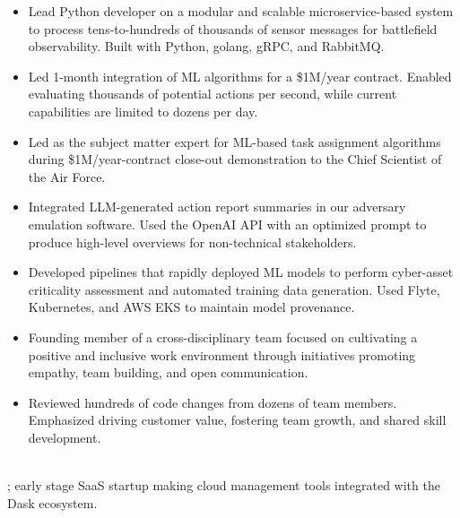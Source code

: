 \begin{itemize}
\item Lead Python developer on a modular and scalable microservice-based system to process tens-to-hundreds of thousands of sensor messages for battlefield observability. Built with Python, golang, gRPC, and RabbitMQ.
\item Led 1-month integration of ML algorithms for a \$1M/year contract. Enabled evaluating thousands of potential actions per second, while current capabilities are limited to dozens per day.
\item Led as the subject matter expert for ML-based task assignment algorithms during \$1M/year-contract close-out demonstration to the Chief Scientist of the Air Force.
\item Integrated LLM-generated action report summaries in our adversary emulation software. Used the OpenAI API with an optimized prompt to produce high-level overviews for non-technical stakeholders.
\item Developed pipelines that rapidly deployed ML models to perform cyber-asset criticality assessment and automated training data generation. Used Flyte, Kubernetes, and AWS EKS to maintain model provenance.
\item Founding member of a cross-disciplinary team focused on cultivating a positive and inclusive work environment through initiatives promoting empathy, team building, and open communication.
\item Reviewed hundreds of code changes from dozens of team members. Emphasized driving customer value, fostering team growth, and shared skill development.
\end{itemize}
\sectionsep

\\
; early stage SaaS startup making cloud management tools integrated with the Dask ecosystem.

